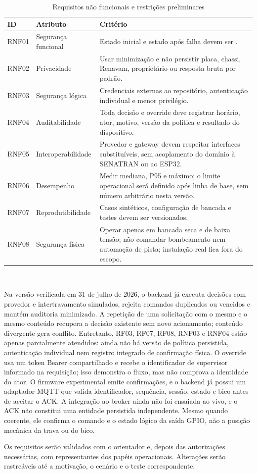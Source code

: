 \begin{table}[H]
  \centering
  \caption{Requisitos não funcionais e restrições preliminares}
  \label{tab:rnf}
  \small
  \begin{tabularx}{\textwidth}{@{}L{1.2cm}L{2.9cm}Y@{}}
    \toprule
    \textbf{ID} & \textbf{Atributo} & \textbf{Critério} \\
    \midrule
    RNF01 & Segurança funcional & Estado inicial e estado após falha devem ser . \\
    RNF02 & Privacidade & Usar minimização e não persistir placa, chassi, Renavam, proprietário ou resposta bruta por padrão. \\
    RNF03 & Segurança lógica & Credenciais externas ao repositório, autenticação individual e menor privilégio. \\
    RNF04 & Auditabilidade & Toda decisão e override deve registrar horário, ator, motivo, versão da política e resultado do dispositivo. \\
    RNF05 & Interoperabilidade & Provedor e gateway devem respeitar interfaces substituíveis, sem acoplamento do domínio à SENATRAN ou ao ESP32. \\
    RNF06 & Desempenho & Medir mediana, P95 e máximo; o limite operacional será definido após linha de base, sem número arbitrário nesta versão. \\
    RNF07 & Reprodutibilidade & Casos sintéticos, configuração de bancada e testes devem ser versionados. \\
    RNF08 & Segurança física & Operar apenas em bancada seca e de baixa tensão; não comandar bombeamento nem automação de pista; instalação real fica fora do escopo. \\
    \bottomrule
  \end{tabularx}
  \\[2pt]\fontepropria
\end{table}

Na versão verificada em 31 de julho de 2026, o backend já executa decisões com
provedor e intertravamento simulados, rejeita comandos duplicados ou vencidos e
mantém auditoria minimizada. A repetição de uma solicitação com o mesmo
 e o mesmo conteúdo recupera a decisão existente sem
novo acionamento; conteúdo divergente gera conflito. Entretanto, RF03, RF07,
RF08, RNF03 e RNF04 estão
apenas parcialmente atendidos: ainda não há versão de política persistida,
autenticação individual nem registro integrado de confirmação física. O
override usa um token Bearer compartilhado e recebe o identificador de
supervisor informado na requisição; isso demonstra o fluxo, mas não comprova a
identidade do ator. O firmware experimental emite confirmações, e o backend já
possui um adaptador MQTT que valida identificador, sequência, sessão, estado e
bico antes de aceitar o ACK. A integração ao broker ainda não foi ensaiada ao
vivo, e o ACK não constitui uma entidade persistida independente. Mesmo quando
coerente, ele confirma o comando e o estado lógico da saída GPIO, não a posição
mecânica da trava ou do bico.

Os requisitos serão validados com o orientador e, depois das autorizações
necessárias, com representantes dos papéis operacionais. Alterações serão
rastreáveis até a motivação, o cenário e o teste correspondente.
